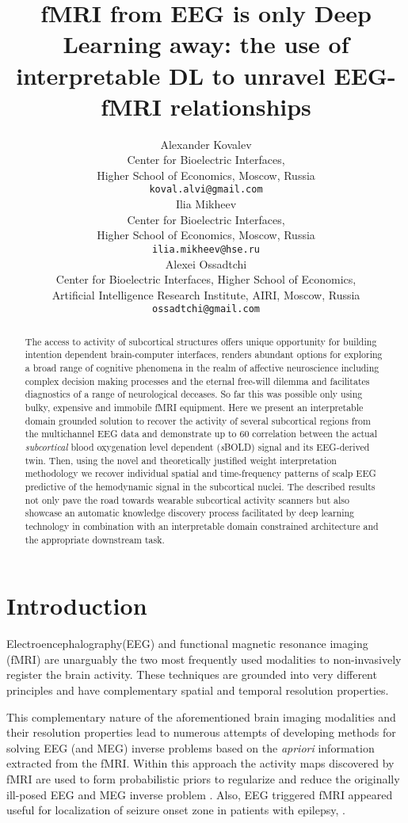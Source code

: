 \documentclass{article}
\title{ fMRI from EEG is only Deep Learning away: the use of interpretable DL to unravel EEG-fMRI relationships
}
\author{Alexander Kovalev\\
Center for Bioelectric Interfaces, \\ Higher School of Economics, Moscow, Russia \\  \texttt{koval.alvi@gmail.com} \\
   \And
   Ilia Mikheev\\
    Center for Bioelectric Interfaces, \\ Higher School of Economics, Moscow, Russia \\   \texttt{ilia.mikheev@hse.ru} \\
   \And
   Alexei Ossadtchi  \\
Center for Bioelectric Interfaces, Higher School of Economics, \\ 
Artificial Intelligence Research Institute, AIRI, Moscow, Russia  \\ \texttt{ossadtchi@gmail.com} \\
}
\begin{document}
\maketitle


\begin{abstract}

The access to activity of subcortical structures offers unique opportunity for building intention dependent brain-computer interfaces, renders abundant options for exploring a broad range of cognitive phenomena in the realm of affective neuroscience including complex decision making processes and the eternal free-will dilemma and facilitates diagnostics of a range of neurological deceases. So far this was possible only using bulky, expensive and immobile fMRI equipment. 
Here we present an interpretable domain grounded solution to recover the activity of several subcortical regions from the multichannel EEG data and demonstrate up to 60  correlation between the actual \textit{subcortical} blood oxygenation level dependent (\textit{s}BOLD) signal and its EEG-derived twin. Then, using the novel and theoretically justified weight interpretation methodology we recover individual spatial and time-frequency patterns of scalp EEG predictive of the hemodynamic signal in the subcortical nuclei. 
The described results not only pave the road towards wearable subcortical activity scanners but also showcase an automatic knowledge discovery process facilitated by deep learning technology in combination with an interpretable domain constrained architecture and the appropriate downstream task. 

\end{abstract}

\section{Introduction}
Electroencephalography(EEG) and functional magnetic resonance imaging (fMRI) are unarguably the two most frequently used modalities to non-invasively register the brain activity. These techniques are grounded into very different principles and have complementary spatial and temporal resolution properties.  

This  complementary nature of the aforementioned brain imaging modalities and their resolution properties lead to numerous attempts of developing methods for solving EEG (and MEG) inverse problems based on the \textit{apriori} information extracted from the fMRI.  Within this approach the activity maps discovered by fMRI are used to form probabilistic priors to regularize and reduce the originally ill-posed EEG and MEG inverse problem \cite{megfmri}. Also, EEG triggered fMRI appeared useful for localization of seizure onset zone in patients with epilepsy, \cite{gotman2011combining}.  
\end{document}
